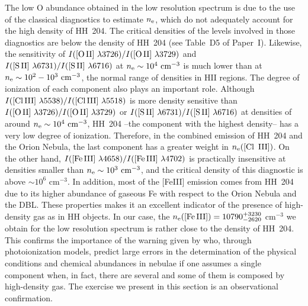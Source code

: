 \documentclass[twocolumn]{aastex63}
\begin{document}
The low O abundance obtained in the low resolution spectrum is due to the use of the classical diagnostics to estimate $n_{\rm e}$, which do not adequately account for the high density of HH~204. The critical densities of the levels involved in those diagnostics are below the density of HH~204 (see Table~D5 of Paper~I). Likewise, the sensitivity of $I(\text{[O\thinspace II] } \lambda 3726)/I(\text{[O\thinspace II] } \lambda 3729)$ and $I(\text{[S\thinspace II] } \lambda 6731)/I(\text{[S\thinspace II] } \lambda 6716)$ at $n_{\rm e} \sim 10^4 \text{ cm}^{-3}$ is much lower than at $n_{\rm e} \sim 10^2 - 10^3 \text{ cm}^{-3}$, the normal range of densities in H\thinspace II regions. The degree of ionization of each component also plays an important role. Although $I(\text{[Cl\thinspace III] } \lambda 5538)/I(\text{[Cl\thinspace III] } \lambda 5518)$ is more density sensitive than $I(\text{[O\thinspace II] } \lambda 3726)/I(\text{[O\thinspace II] } \lambda 3729)$ or $I(\text{[S\thinspace II] } \lambda 6731)/I(\text{[S\thinspace II] } \lambda 6716)$ at densities of around $n_{\rm e}\sim 10^{4} \text{ cm}^{-3}$, HH~204 --the component with the highest density-- has a very low degree of ionization. Therefore, in the combined emission of HH~204 and the Orion Nebula, the last  component has a greater weight in $n_{\rm e}(\text{[Cl \thinspace III]})$. On the other hand, $I(\text{[Fe\thinspace III] } \lambda 4658)/I(\text{[Fe\thinspace III] } \lambda 4702)$ is practically insensitive at densities smaller than $n_{\rm e}\sim 10^{3}\text{ cm}^{-3}$, and the critical density of this diagnostic is above $\sim 10^{6}\text{ cm}^{-3}$. In addition, most of the [Fe\thinspace III] emission comes from HH~204 due to its higher abundance of gaseous Fe with respect to the Orion Nebula and the DBL. These properties makes it an excellent indicator of the presence of high-density gas as in HH objects. In our case, the $n_{\rm e}(\text{[Fe\thinspace III]})=10790^{+3230} _{-2620}$  cm$^{-3}$ we obtain for the low resolution spectrum is rather close to the density of HH~204. This confirms the importance of the warning given by \citet{Morisset17} who, through photoionization models, predict large errors in the determination of the physical conditions and chemical abundances in nebulae if one assumes a single component when, in fact, there are several and some of them is composed by high-density gas. The exercise we present in this section is an observational confirmation.
\end{document}
